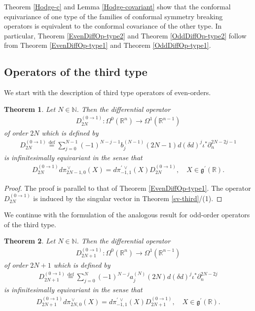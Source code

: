 \documentclass[a4paper,12pt,reqno]{amsart}
\newtheorem{theorem}{Theorem}
\numberwithin{theorem}{subsection}
\numberwithin{equation}{section}
\begin{document}
Theorem \ref{Hodge-c} and Lemma \ref{Hodge-covariant} show that the conformal
equivariance of one type of the families of conformal symmetry breaking
operators is equivalent to the conformal covariance of the other type. In
particular, Theorem \ref{EvenDiffOp-type2} and Theorem \ref{OddDiffOp-type2}
follow from Theorem \ref{EvenDiffOp-type1} and Theorem \ref{OddDiffOp-type1}.

\subsection{Operators of the third type}\label{CSBO-type3}

We start with the description of third type operators of even-orders.

\begin{theorem}\label{DO3-Even} Let $N\in{\mathbb{N}}$. Then the differential operator
\begin{align*}
   D_{2N}^{(0\to 1)}: \Omega^0({\mathbb{R}}^n)\to \Omega^1({\mathbb{R}}^{n-1})
\end{align*}
of order $2N$ which is defined by
\begin{align*}
   D_{2N}^{(0\to 1)} {\stackrel{\text{def}}{=}} \sum_{j=0}^{N-1} (-1)^{N-j-1} b_j^{(N-1)}(2N\!-\!1)
   {d} (\delta{d})^j \iota^* \partial_n^{2N-2j-1}
\end{align*}
is infinitesimally equivariant in the sense that
\begin{align*}
   D_{2N}^{(0\to 1)} {d}\pi^{{\,\vee}}_{2N-1,0}(X)
   = {d}\pi^{\prime{{\,\vee}}}_{-1,1}(X) D^{(0\to 1)}_{2N}, \quad  X\in{{\mathfrak g}}^\prime({\mathbb{R}}).
\end{align*}
\end{theorem}

\begin{proof} The proof is parallel to that of Theorem \ref{EvenDiffOp-type1}. The
operator $D_{2N}^{(0\to 1)}$ is induced by the singular vector in Theorem
\ref{sv-third}/(1).
\end{proof}

We continue with the formulation of the analogous result for odd-order
operators of the third type.

\begin{theorem}\label{DO3-Odd} Let $N\in{\mathbb{N}}$. Then the differential operator
\begin{align*}
   D_{2N+1}^{(0\to 1)}: \Omega^0({\mathbb{R}}^n)\to \Omega^1({\mathbb{R}}^{n-1})
\end{align*}
of order $2N+1$ which is defined by
\begin{align*}
   D_{2N+1}^{(0\to 1)} {\stackrel{\text{def}}{=}} \sum_{j=0}^{N}(-1)^{N-j} a_j^{(N)}(2N)
   {d} (\delta{d})^{j} \iota^* \partial_n^{2N-2j}
\end{align*}
is infinitesimally equivariant in the sense that
\begin{align*}
   D_{2N+1}^{(0\to 1)} {d}\pi^{{\,\vee}}_{2N,0}(X)
   = {d}\pi^{\prime{{\,\vee}}}_{-1,1}(X) D^{(0\to 1)}_{2N+1}, \quad X \in {{\mathfrak g}}^\prime({\mathbb{R}}).
\end{align*}
\end{theorem}
\end{document}
